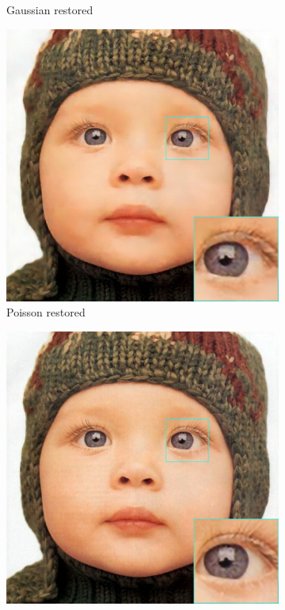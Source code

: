 \begin{figure}
\begin{subfigure}{0.24\textwidth}
		\caption{Gaussian restored}
	\end{subfigure}
	\begin{subfigure}{0.24\textwidth}
		\includegraphics[width=\textwidth]{images/exp1.2/poisson.png}
		\caption{Poisson restored}
	\end{subfigure}
	\begin{subfigure}{0.24\textwidth}
		\includegraphics[width=\textwidth]{images/exp1.2/salt.png}

\end{subfigure}
\end{figure}
